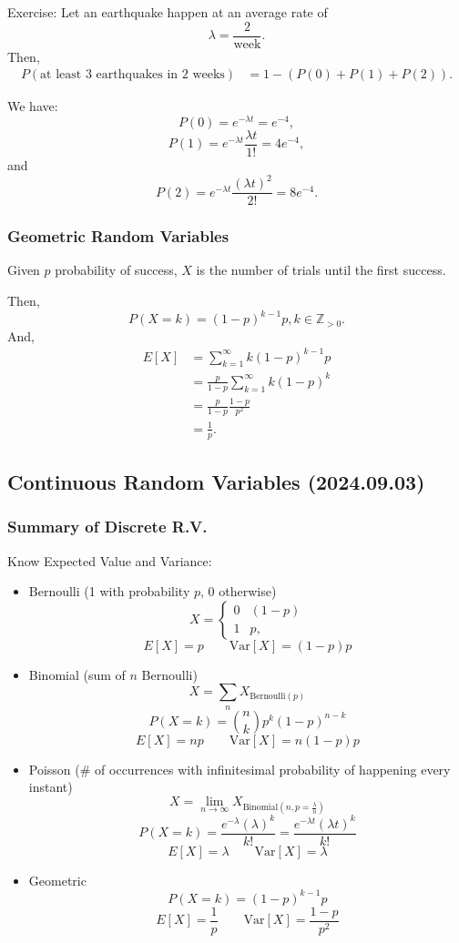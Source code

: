 \documentclass[12pt]{article}
\begin{document}
Exercise:
Let an earthquake happen at an average rate of
\[\lambda = \frac{2}{\text{week}}.\]
Then,
\begin{align*}P(\text{at least 3 earthquakes in 2 weeks}) &= 1-(P(0)+P(1)+P(2)).
\end{align*}

We have:
\[P(0)=e^{-\lambda t}=e^{-4},\]
\[P(1)=e^{-\lambda t}\frac{\lambda t}{1!}=4e^{-4},\]
and
\[P(2)=e^{-\lambda t}\frac{(\lambda t)^2}{2!}=8e^{-4}.\]

\subsubsection{Geometric Random Variables}
Given $p$ probability of success, $X$ is the number of trials until the first success.

Then,
\[P(X=k)=(1-p)^{k-1}p,k\in\mathbb{Z}_{>0}.\]
And,
\begin{align*}E[X] &= \sum_{k=1}^\infty k(1-p)^{k-1} p\\
&=\frac{p}{1-p}\sum_{k=1}^\infty k(1-p)^k\\
&=\frac{p}{1-p}\frac{1-p}{p^2}\\
&=\frac{1}{p}.\end{align*}


\subsection{Continuous Random Variables (2024.09.03)}
\subsubsection{Summary of Discrete R.V.}
Know Expected Value and Variance:
\begin{itemize}
    \item Bernoulli (1 with probability $p$, 0 otherwise)
    \[X=\begin{cases}
        0&(1-p)\\
        1&p,
    \end{cases}\]
    \[E[X] = p \qquad \text{Var}[X] = (1-p)p\]
    \item Binomial (sum of $n$ Bernoulli)
    \[X = \sum_n X_{\text{Bernoulli}(p)}\]
    \[P(X = k) = \binom{n}{k} p^k (1-p)^{n-k}\]
    \[E[X] = n p \qquad \text{Var}[X] = n(1-p)p\]
    \item Poisson (\# of occurrences with infinitesimal probability of happening every instant)
    \[X = \lim_{n \to \infty} X_{\text{Binomial}(n,p=\frac{\lambda}{n})}\]
    \[P(X=k) = \frac{e^{-\lambda}(\lambda)^k}{k!}=\frac{e^{-\lambda t}(\lambda t)^k}{k!}\]
    \[E[X] = \lambda \qquad \text{Var}[X] = \lambda\]
    \item Geometric
    \[P(X=k)=(1-p)^{k-1}p\]
    \[E[X] = \frac{1}{p} \qquad \text{Var}[X] = \frac{1-p}{p^2}\]
\end{itemize}
\end{document}
